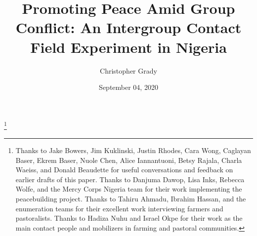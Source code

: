 \documentclass[11pt]{article}
\title{Promoting Peace Amid Group Conflict: An Intergroup Contact Field
Experiment in Nigeria}
\author{\parbox{.7\linewidth}{\centering
Christopher Grady
}
}
\date{September 04, 2020}
\begin{document}
\VerbatimFootnotes

%
%
%
%
%
%
%
%
%
%

\newlength{\cslhangindent}
\setlength{\cslhangindent}{1.5em}
\newenvironment{cslreferences}%
  {\setlength{\parindent}{0pt}%
  \everypar{\setlength{\hangindent}{\cslhangindent}}\ignorespaces}%
  {\par}

\maketitle


\newcommand\blfootnote[1]{%
  \begingroup
  \renewcommand\thefootnote{}\footnote{#1}%
  \addtocounter{footnote}{-1}%
  \endgroup
}
\singlespacing\blfootnote{Thanks to Jake Bowers, Jim Kuklinski, Justin
Rhodes, Cara Wong, Caglayan Baser, Ekrem Baser, Nuole Chen, Alice
Iannantuoni, Betsy Rajala, Charla Waeiss, and Donald Beaudette for
useful conversations and feedback on earlier drafts of this paper.
Thanks to Danjuma Dawop, Lisa Inks, Rebecca Wolfe, and the Mercy Corps
Nigeria team for their work implementing the peacebuilding project.
Thanks to Tahiru Ahmadu, Ibrahim Hassan, and the enumeration teams for
their excellent work interviewing farmers and pastoralists. Thanks to
Hadiza Nuhu and Israel Okpe for their work as the main contact people
and mobilizers in farming and pastoral communities.}
\end{document}
